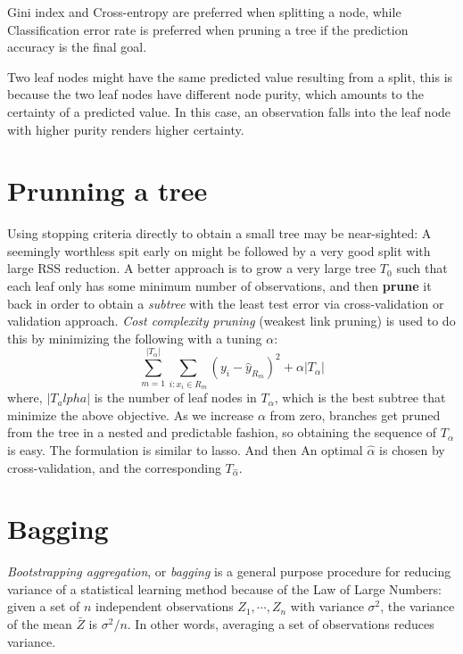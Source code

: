 \documentclass[
  letterpaper,
  DIV=11,
  numbers=noendperiod]{scrreprt}
\begin{document}
Gini index and Cross-entropy are preferred when splitting a node, while
Classification error rate is preferred when pruning a tree if the
prediction accuracy is the final goal.

Two leaf nodes might have the same predicted value resulting from a
split, this is because the two leaf nodes have different node purity,
which amounts to the certainty of a predicted value. In this case, an
observation falls into the leaf node with higher purity renders higher
certainty.

\section{Prunning a tree}\label{prunning-a-tree}

Using stopping criteria directly to obtain a small tree may be
near-sighted: A seemingly worthless spit early on might be followed by a
very good split with large RSS reduction. A better approach is to grow a
very large tree \(T_0\) such that each leaf only has some minimum number
of observations, and then \textbf{prune} it back in order to obtain a
\emph{subtree} with the least test error via cross-validation or
validation approach. \emph{Cost complexity pruning} (weakest link
pruning) is used to do this by minimizing the following with a tuning
\(\alpha\): \[
\sum_{m=1}^{|T_\alpha|}\sum_{i:x_i\in R_m}(y_i-\hat{y}_{R_m})^2+\alpha |T_\alpha|
\] where, \(|T_alpha|\) is the number of leaf nodes in \(T_\alpha\),
which is the best subtree that minimize the above objective. As we
increase \(\alpha\) from zero, branches get pruned from the tree in a
nested and predictable fashion, so obtaining the sequence of
\(T_\alpha\) is easy. The formulation is similar to lasso. And then An
optimal \(\hat{\alpha}\) is chosen by cross-validation, and the
corresponding \(T_{\hat{\alpha}}\).

\section{Bagging}\label{bagging}

\emph{Bootstrapping aggregation}, or \emph{bagging} is a general purpose
procedure for reducing variance of a statistical learning method because
of the Law of Large Numbers: given a set of \(n\) independent
observations \(Z_1, \cdots, Z_n\) with variance \(\sigma^2\), the
variance of the mean \(\bar{Z}\) is \(\sigma^2/n\). In other words,
averaging a set of observations reduces variance.
\end{document}
